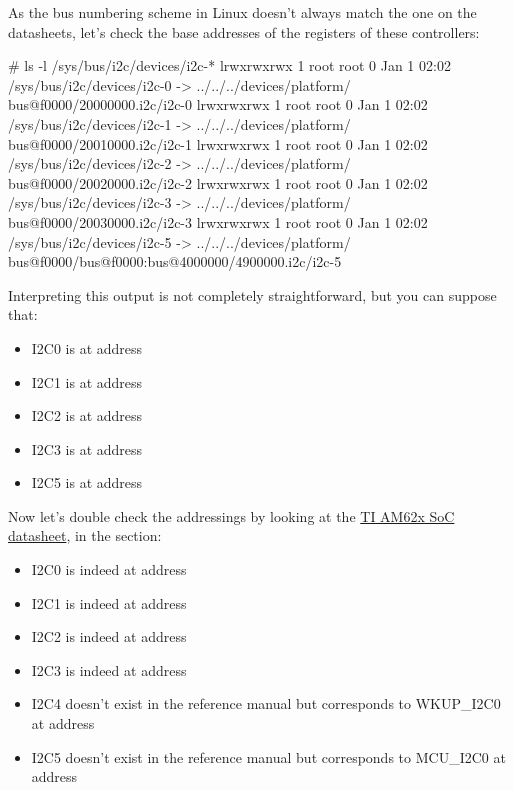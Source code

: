 As the bus numbering scheme in Linux doesn't always match the one
on the datasheets, let's check the base addresses of the registers
of these controllers:

\begin{bashinput}
# ls -l /sys/bus/i2c/devices/i2c-*
lrwxrwxrwx 1 root root 0 Jan 1 02:02 /sys/bus/i2c/devices/i2c-0 -> ../../../devices/platform/
bus@f0000/20000000.i2c/i2c-0
lrwxrwxrwx 1 root root 0 Jan 1 02:02 /sys/bus/i2c/devices/i2c-1 -> ../../../devices/platform/
bus@f0000/20010000.i2c/i2c-1
lrwxrwxrwx 1 root root 0 Jan 1 02:02 /sys/bus/i2c/devices/i2c-2 -> ../../../devices/platform/
bus@f0000/20020000.i2c/i2c-2
lrwxrwxrwx 1 root root 0 Jan 1 02:02 /sys/bus/i2c/devices/i2c-3 -> ../../../devices/platform/
bus@f0000/20030000.i2c/i2c-3
lrwxrwxrwx 1 root root 0 Jan 1 02:02 /sys/bus/i2c/devices/i2c-5 -> ../../../devices/platform/
bus@f0000/bus@f0000:bus@4000000/4900000.i2c/i2c-5
\end{bashinput}

Interpreting this output is not completely straightforward, but you can suppose
that:

\begin{itemize}
\item I2C0 is at address 
\item I2C1 is at address 
\item I2C2 is at address 
\item I2C3 is at address 
\item I2C5 is at address 
\end{itemize}

Now let's double check the addressings by looking at the
\href{https://www.ti.com/lit/ug/spruiv7a/spruiv7a.pdf}{TI AM62x SoC
datasheet}, in the  section:

\begin{itemize}
\item I2C0 is indeed at address 
\item I2C1 is indeed at address 
\item I2C2 is indeed at address 
\item I2C3 is indeed at address 
\item I2C4 doesn't exist in the reference manual but corresponds to
      WKUP\_I2C0 at address 
\item I2C5 doesn't exist in the reference manual but corresponds to
      MCU\_I2C0 at address 
\end{itemize}

